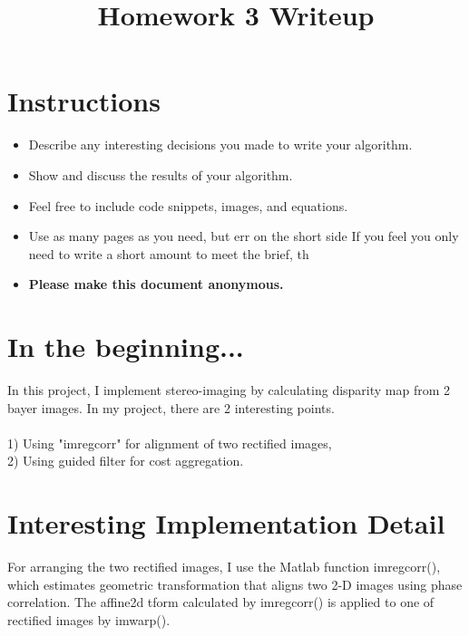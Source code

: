 \title{\vspace{-1cm}Homework 3 Writeup}



\maketitle
\vspace{-3cm}
\thispagestyle{fancy}

\section*{Instructions}
\begin{itemize}
  \item Describe any interesting decisions you made to write your algorithm.
  \item Show and discuss the results of your algorithm.
  \item Feel free to include code snippets, images, and equations.
  \item Use as many pages as you need, but err on the short side If you feel you only need to write a short amount to meet the brief, th
  
  \item \textbf{Please make this document anonymous.}
\end{itemize}

\section*{In the beginning...}

In this project, I implement stereo-imaging by calculating disparity map from 2 bayer images. In my project, there are 2 interesting points. \\
\\
1) Using "imregcorr" for alignment of two rectified images,\\
2) Using guided filter for cost aggregation.\\


\section*{Interesting Implementation Detail}

For arranging the two rectified images, I use the Matlab function imregcorr(), which estimates geometric transformation that aligns two 2-D images using phase correlation. The affine2d tform calculated by imregcorr() is applied to one of rectified images by imwarp().

